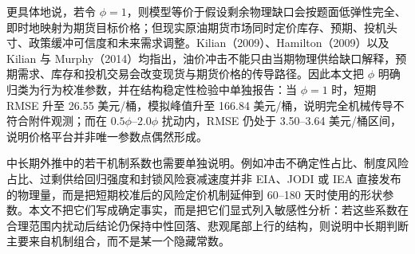 更具体地说，若令 \(\phi=1\)，则模型等价于假设剩余物理缺口会按题面低弹性完全、即时地映射为期货目标价格；但现实原油期货市场同时定价库存、预期、投机头寸、政策缓冲可信度和未来需求调整。Kilian（2009）、Hamilton（2009）以及 Kilian 与 Murphy（2014）均指出，油价冲击不能只由当期物理供给缺口解释，预期需求、库存和投机交易会改变现货与期货价格的传导路径。因此本文把 \(\phi\) 明确归类为行为校准参数，并在结构稳定性检验中单独报告：当 \(\phi=1\) 时，短期 RMSE 升至 26.55 美元/桶，模拟峰值升至 166.84 美元/桶，说明完全机械传导不符合附件观测；而在 \(0.5\phi\)--\(2.0\phi\) 扰动内，RMSE 仍处于 3.50--3.64 美元/桶区间，说明价格平台并非唯一参数点偶然形成。

中长期外推中的若干机制系数也需要单独说明。例如冲击不确定性占比、制度风险占比、过剩供给回归强度和封锁风险衰减速度并非 EIA、JODI 或 IEA 直接发布的物理量，而是把短期校准后的风险定价机制延伸到 60--180 天时使用的形状参数。本文不把它们写成确定事实，而是把它们显式列入敏感性分析：若这些系数在合理范围内扰动后结论仍保持中性回落、悲观尾部上行的结构，则说明中长期判断主要来自机制组合，而不是某一个隐藏常数。
